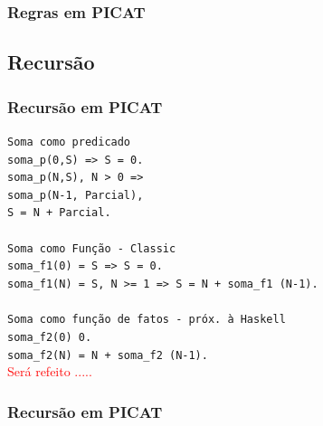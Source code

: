 \documentclass[10pt]{beamer}
\begin{document}
\begin{frame}[allowframebreaks=0.9]
 \frametitle{Regras em PICAT}


\end{frame}


\subsection{Recursão}

\begin{frame}%
 \frametitle{Recursão em PICAT}

\begin{block}{}

    \texttt{Soma como predicado}\\
    \texttt{soma\_p(0,S) => S = 0.}\\
    \texttt{soma\_p(N,S), N > 0 =>}\\
    \texttt{\qquad \qquad \qquad \qquad \qquad soma\_p(N-1, Parcial),}\\
    \texttt{\qquad \qquad \qquad \qquad \qquad S = N + Parcial.}\\
		\texttt{}\\
		\texttt{Soma como Função - Classic}\\
		\texttt{soma\_f1(0) = S => S = 0.}\\
		\texttt{soma\_f1(N) = S, N >= 1 => S = N + soma\_f1 (N-1).}\\
		\texttt{}\\
		\texttt{Soma como função de fatos - próx. à Haskell}\\
		\texttt{soma\_f2(0) 0.}\\
		\texttt{soma\_f2(N) = N + soma\_f2 (N-1).}\\

\textcolor{red}{Será refeito .....}

\end{block}

\end{frame}



\begin{frame}[allowframebreaks=0.9]
 \frametitle{Recursão em PICAT}



\end{frame}
\end{document}
